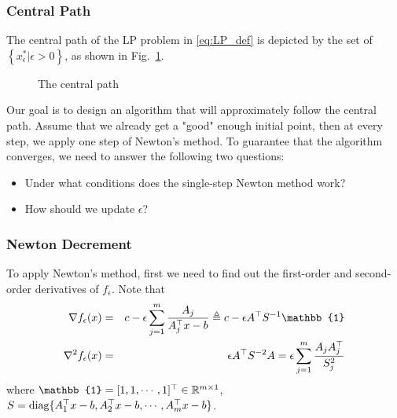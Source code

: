 \subsubsection{Central Path}
The central path of the LP problem in \ref{eq:LP_def} is depicted by the set of $\left\{x^*_\epsilon|\epsilon>0\right\}$, as shown in Fig.~\ref{fig:central_path}.
\begin{figure}[h!]
\centering
{}
\caption{The central path\label{fig:central_path}}
\end{figure}

Our goal is to design an algorithm that will approximately follow the central path. Assume that we already get a "good" enough initial point, then at every step, we apply one step of Newton's method. To guarantee that the algorithm converges, we need to answer the following two questions:
\begin{itemize}
\item Under what conditions does the single-step Newton method work?
\item How should we update $\epsilon$?
\end{itemize}

\subsubsection{Newton Decrement}
To apply Newton's method, first we need to find out the first-order and second-order derivatives of $f_\epsilon$. Note that
\begin{eqnarray}
\nabla f_\epsilon(x)&=&c-\epsilon \sum_{j=1}^m \dfrac{A_j}{A^\trans_j x-b}\triangleq c-\epsilon A^\trans S^{-1}\mathbb{1}\label{eq:grad_f_eps}\\
\nabla^2f_\epsilon(x)&=&\epsilon A^\trans S^{-2}A=\epsilon \sum_{j=1}^m\dfrac{A_j A_j^\trans}{S_j^2}\label{eq:hessian_f_eps}
\end{eqnarray}
where $\mathbb{1}=[1,1,\cdots,1]^\trans\in\mathbb{R}^{m\times1}$, $S=\mathrm{diag}\{A^\top_1 x-b, A^\top_2 x-b, \cdots, A^\top_m x-b\}$.

